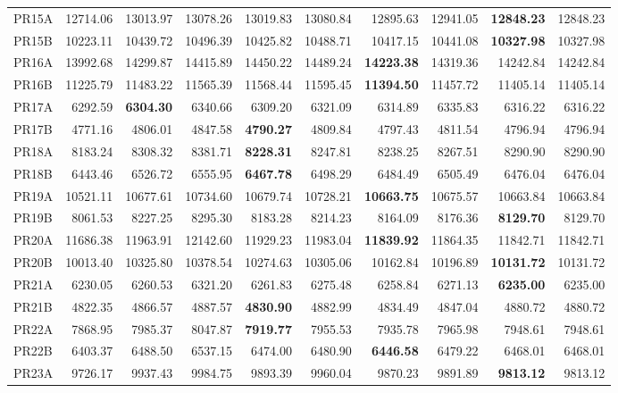 \documentclass{setp-new}
\begin{document}
\begin{table}[H]
{\begin{tabular}{lrrrrrrrrr}
    PR15A & 12714.06 & 13013.97 & 13078.26 & 13019.83 & 13080.84 & 12895.63 & 12941.05 & \textbf{12848.23} & 12848.23\\
    PR15B & 10223.11 & 10439.72 & 10496.39 & 10425.82 & 10488.71 & 10417.15 & 10441.08 & \textbf{10327.98} & 10327.98\\
    PR16A & 13992.68 & 14299.87 & 14415.89 & 14450.22 & 14489.24 & \textbf{14223.38} & 14319.36 & 14242.84 & 14242.84\\
    PR16B & 11225.79 & 11483.22 & 11565.39 & 11568.44 & 11595.45 & \textbf{11394.50} & 11457.72 & 11405.14 & 11405.14\\
    PR17A & 6292.59 & \textbf{6304.30} & 6340.66 & 6309.20 & 6321.09 & 6314.89 & 6335.83 & 6316.22 & 6316.22\\
    PR17B & 4771.16 & 4806.01 & 4847.58 & \textbf{4790.27} & 4809.84 & 4797.43 & 4811.54 & 4796.94 & 4796.94\\
    PR18A & 8183.24 & 8308.32 & 8381.71 & \textbf{8228.31} & 8247.81 & 8238.25 & 8267.51 & 8290.90 & 8290.90\\
    PR18B & 6443.46 & 6526.72 & 6555.95 & \textbf{6467.78} & 6498.29 & 6484.49 & 6505.49 & 6476.04 & 6476.04\\
    PR19A & 10521.11 & 10677.61 & 10734.60 & 10679.74 & 10728.21 & \textbf{10663.75} & 10675.57 & 10663.84 & 10663.84\\
    PR19B & 8061.53 & 8227.25 & 8295.30 & 8183.28 & 8214.23 & 8164.09 & 8176.36 & \textbf{8129.70} & 8129.70\\
    PR20A & 11686.38 & 11963.91 & 12142.60 & 11929.23 & 11983.04 & \textbf{11839.92} & 11864.35 & 11842.71 & 11842.71\\
    PR20B & 10013.40 & 10325.80 & 10378.54 & 10274.63 & 10305.06 & 10162.84 & 10196.89 & \textbf{10131.72} & 10131.72\\
    PR21A & 6230.05 & 6260.53 & 6321.20 & 6261.83 & 6275.48 & 6258.84 & 6271.13 & \textbf{6235.00} & 6235.00\\
    PR21B & 4822.35 & 4866.57 & 4887.57 & \textbf{4830.90} & 4882.99 & 4834.49 & 4847.04 & 4880.72 & 4880.72\\
    PR22A & 7868.95 & 7985.37 & 8047.87 & \textbf{7919.77} & 7955.53 & 7935.78 & 7965.98 & 7948.61 & 7948.61\\
    PR22B & 6403.37 & 6488.50 & 6537.15 & 6474.00 & 6480.90 & \textbf{6446.58} & 6479.22 & 6468.01 & 6468.01\\
    PR23A & 9726.17 & 9937.43 & 9984.75 & 9893.39 & 9960.04 & 9870.23 & 9891.89 & \textbf{9813.12} & 9813.12\\

\end{tabular}}
\end{table}
\end{document}
